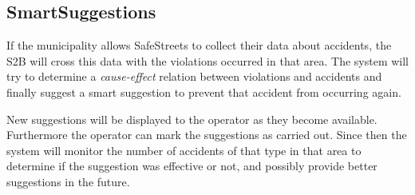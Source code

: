 \subsection{SmartSuggestions}
If the municipality allows SafeStreets to collect their data about accidents,
the S2B will cross this data with the violations occurred in that area.
The system will try to determine a \emph{cause-effect} relation between
violations and accidents and finally suggest a smart suggestion to prevent that
accident from occurring again.

New suggestions will be displayed to the operator as they become available.
Furthermore the operator can mark the suggestions as carried out.
Since then the system will monitor the number of accidents of that type in that
area to determine if the suggestion was effective or not, and possibly provide
better suggestions in the future.